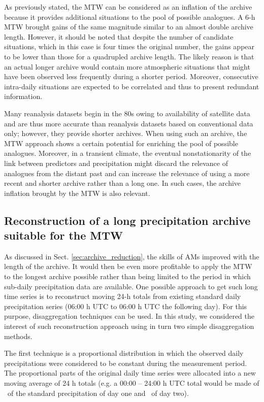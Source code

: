 \documentclass[hess, manuscript]{copernicus}
\begin{document}
	As previously stated, the MTW can be considered as an inflation of the archive because it provides additional situations to the pool of possible analogues. A 6-h MTW brought gains of the same magnitude similar to an almost double archive length. However, it should be noted that despite the number of candidate situations, which in this case is four times the original number, the gains appear to be lower than those for a quadrupled archive length. The likely reason is that an actual longer archive would contain more atmospheric situations that might have been observed less frequently during a shorter period. Moreover, consecutive intra-daily situations are expected to be correlated and thus to present redundant information.
	
	Many reanalysis datasets begin in the 80s owing to availability of satellite data and are thus more accurate than reanalysis datasets based on conventional data only; however, they provide shorter archives. When using such an archive, the MTW approach shows a certain potential for enriching the pool of possible analogues. Moreover, in a transient climate, the eventual nonstationarity of the link between predictors and precipitation might discard the relevance of analogues from the distant past and can increase the relevance of using a more recent and shorter archive rather than a long one. In such cases, the archive inflation brought by the MTW is also relevant.
	
	
	\subsection{Reconstruction of a long precipitation archive suitable for the MTW}
	\label{sec:reconstruction}
	
	As discussed in Sect. \ref{sec:archive_reduction}, the skills of AMs improved with the length of the archive. It would then be even more profitable to apply the MTW to the longest archive possible rather than being limited to the period in which sub-daily precipitation data are available. One possible approach to get such long time series is to reconstruct moving 24-h totals from existing standard daily precipitation series (06:00 h UTC to 06:00 h UTC the following day). For this purpose, disaggregation techniques can be used. In this study, we considered the interest of such reconstruction approach using in turn two simple disaggregation methods.
	
	The first technique is a proportional distribution in which the observed daily precipitations were considered to be constant during the measurement period. The proportional parts of the original daily time series were allocated into a new moving average of 24 h totals (e.g. a 00:00 -- 24:00 h UTC total would be made of \textonequarter\ of the standard precipitation of day one and \textthreequarters\ of day two). 
	
\end{document}
